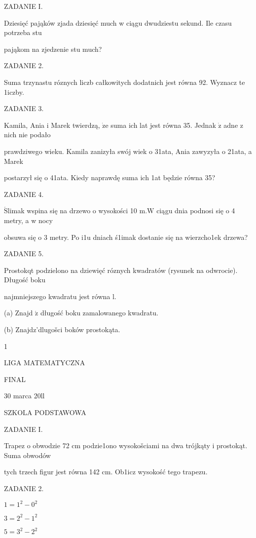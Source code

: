 \documentclass[a4paper,12pt]{article}
\begin{document}
ZADANIE I.

Dziesięć pająków zjada dziesięć much w ciągu dwudziestu sekund. Ile czasu potrzeba stu

pająkom na zjedzenie stu much?

ZADANIE 2.

Suma trzynastu róznych liczb całkowitych dodatnich jest równa 92. Wyznacz te 1iczby.

ZADANIE 3.

Kamila, Ania i Marek twierdzą, $\dot{\mathrm{z}}\mathrm{e}$ suma ich lat jest równa 35. Jednak $\dot{\mathrm{z}}$ adne z nich nie podało

prawdziwego wieku. Kamila zanizyła swój wiek o 31ata, Ania zawyzyła o 21ata, a Marek

postarzył się o 41ata. Kiedy naprawdę suma ich 1at będzie równa 35?

ZADANIE 4.

$\acute{\mathrm{S}}$limak wspina się na drzewo o wysokości 10 $\mathrm{m}. \mathrm{W}$ ciągu dnia podnosi się o 4 metry, a w nocy

obsuwa się o 3 metry. Po i1u dniach ś1imak dostanie się na wierzcho1ek drzewa?

ZADANIE 5.

Prostokqt podzielono na dziewięć róznych kwadratów (rysunek na odwrocie). Długość boku

najmniejszego kwadratu jest równa l.

(a) Znajd $\acute{\mathrm{z}}$ długość boku zamalowanego kwadratu.

(b) Znajdz'dlugošci boków prostokąta.




1







LIGA MATEMATYCZNA

FINAL

30 marca 20ll

SZKOLA PODSTAWOWA

ZADANIE I.

Trapez o obwodzie 72 cm podzie1ono wysokošciami na dwa trójkąty i prostokąt. Suma obwodów

tych trzech figur jest równa 142 cm. Ob1icz wysokość tego trapezu.

ZADANIE 2.

$1=1^{2}-0^{2}$

$3=2^{2}-1^{2}$

$5=3^{2}-2^{2}$
\end{document}
